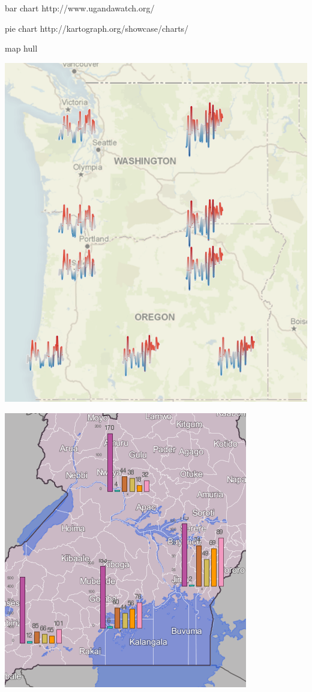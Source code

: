 \begin{itemize}
bar chart
http://www.ugandawatch.org/

pie chart
http://kartograph.org/showcase/charts/

map hull
\cite{Cristani08geoimagemaps}


\parbox [h]{0.4\textwidth }{
    \includegraphics [width=\linewidth]{figures/dia_map_sparklines.png}
    \label{fig:did-map-sparklines}
}
\hfill
\hspace{0.5cm}
\parbox [h]{0.4\textwidth }{
    \includegraphics [width=\linewidth]{figures/dia_map_barchart.png}
}
\end{itemize}
